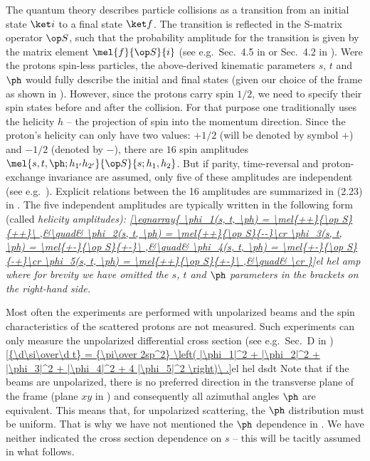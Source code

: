 The quantum theory describes particle collisions as a transition from an initial state $\ket i$ to a final state $\ket f$. The transition is reflected in the S-matrix operator $\op S$, such that the probability amplitude for the transition is given by the matrix element $\mel{f}{\op S}{i}$ (see e.g.~Sec.~4.5 in  or Sec.~4.2 in ). Were the protons spin-less particles, the above-derived kinematic parameters $s$, $t$ and $\ph$ would fully describe the initial and final states (given our choice of the  frame as shown in ). However, since the protons carry spin $1/2$, we need to specify their spin states before and after the collision. For that purpose one traditionally uses the helicity $h$ -- the projection of spin into the momentum direction. Since the proton's helicity can only have two values: $+1/2$ (will be denoted by symbol $+$) and $-1/2$ (denoted by $-$), there are $16$ spin amplitudes $\mel{s, t, \ph; h_{1'} h_{2'}}{\op S}{s; h_1, h_2}$. But if parity, time-reversal and proton-exchange invariance are assumed, only five of these amplitudes are independent (see e.g.~). Explicit relations between the 16 amplitudes are summarized in (2.23) in . The five independent amplitudes are typically written in the following form (called \em{helicity amplitudes}):
\eqref{\eqnarray{
\phi_1(s, t, \ph) = \mel{++}{\op S}{++}\ ,&\quad& \phi_2(s, t, \ph) = \mel{++}{\op S}{--}\cr
\phi_3(s, t, \ph) = \mel{+-}{\op S}{+-}\ ,&\quad& \phi_4(s, t, \ph) = \mel{+-}{\op S}{-+}\cr
\phi_5(s, t, \ph) = \mel{++}{\op S}{+-}\ ,&\quad& \cr
}}{el hel amp}
where for brevity we have omitted the $s$, $t$ and $\ph$ parameters in the brackets on the right-hand side.

Most often the experiments are performed with unpolarized beams and the spin characteristics of the scattered protons are not measured. Such experiments can only measure the unpolarized differential cross section (see e.g.~Sec.~D in )
\eqref{{\d\si\over\d t} = {\pi\over 2sp^2} \left( |\phi_1|^2 + |\phi_2|^2 + |\phi_3|^2 + |\phi_4|^2 + 4 |\phi_5|^2 \right)\ .}{el hel dsdt}
Note that if the beams are unpolarized, there is no preferred direction in the transverse plane of the  frame (plane $xy$ in ) and consequently all azimuthal angles $\ph$ are equivalent. This means that, for unpolarized scattering, the $\ph$ distribution must be uniform. That is why we have not mentioned the $\ph$ dependence in . We have neither indicated the cross section dependence on $s$ -- this will be tacitly assumed in what follows.

